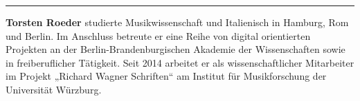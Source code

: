\begin{center}\rule{0.5\linewidth}{\linethickness}\end{center}

\textbf{Torsten Roeder} studierte Musikwissenschaft und Italienisch in
Hamburg, Rom und Berlin. Im Anschluss betreute er eine Reihe von digital
orientierten Projekten an der Berlin-Brandenburgischen Akademie der
Wissenschaften sowie in freiberuflicher Tätigkeit. Seit 2014 arbeitet er
als wissenschaftlicher Mitarbeiter im Projekt „Richard Wagner
Schriften`` am Institut für Musikforschung der Universität Würzburg.

